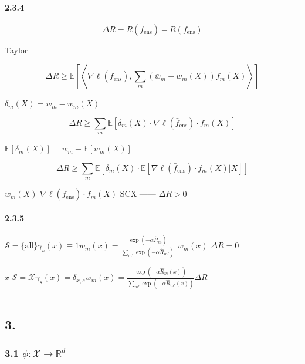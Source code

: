 \documentclass[
  12pt,
]{article}
\begin{document}
\paragraph{2.3.4
}\label{ux4e00ux4e2aux66f4ux7cbeux7ec6ux7684ux8bc1ux660eux901aux8fc7ux5197ux4f59ux5206ux6790}



\[\Delta R = R(\bar{f}_{\text{ens}}) - R(f_{\text{ens}})\]

 Taylor 

\[\Delta R \geq \mathbb{E}\left[\left\langle \nabla \ell(\bar{f}_{\text{ens}}), \sum_m (\bar{w}_m - w_m(X)) f_m(X) \right\rangle\right]\]

 \(\delta_m(X) = \bar{w}_m - w_m(X)\)

\[\Delta R \geq \sum_m \mathbb{E}[\delta_m(X) \cdot \nabla \ell(\bar{f}_{\text{ens}}) \cdot f_m(X)]\]

\(\mathbb{E}[\delta_m(X)] = \bar{w}_m - \mathbb{E}[w_m(X)]\)

\[\Delta R \geq \sum_m \mathbb{E}\left[\delta_m(X) \cdot \mathbb{E}[\nabla \ell(\bar{f}_{\text{ens}}) \cdot f_m(X) | X]\right]\]

 \(w_m(X)\) 
\(\nabla \ell(\bar{f}_{\text{ens}}) \cdot f_m(X)\)  SCX
------ \(\Delta R > 0\)

\paragraph{2.3.5
}\label{ux6781ux7aefux60c5ux51b5ux5f53ux72b6ux6001ux6761ux4ef6ux6743ux91cdux9000ux5316ux4e3aux5168ux5c40ux6743ux91cd}


\(\mathcal{S} = \{\text{all}\}\)\(\gamma_s(x) \equiv 1\)\(w_m(x) = \frac{\exp(-\alpha \hat{R}_m)}{\sum_{m'} \exp(-\alpha \hat{R}_{m'})}\)
\(w_m(x)\)  \(\Delta R = 0\)

 \(x\)
\(\mathcal{S} = \mathcal{X}\)\(\gamma_s(x) = \delta_{x,s}\)\(w_m(x) = \frac{\exp(-\alpha \hat{R}_m(x))}{\sum_{m'} \exp(-\alpha \hat{R}_{m'}(x))}\)\(\Delta R\)


\begin{center}\rule{0.5\linewidth}{0.5pt}\end{center}

\subsection{3.
}\label{ux72b6ux6001ux7a7aux95f4ux6784ux9020ux65b9ux6cd5}

\subsubsection{\texorpdfstring{3.1 
\(\phi: \mathcal{X} \to \mathbb{R}^d\)}{3.1  \textbackslash phi: \textbackslash mathcal\{X\} \textbackslash to \textbackslash mathbb\{R\}\^{}d}}\label{ux5d4cux5165ux6620ux5c04-phi-mathcalx-to-mathbbrd}
\end{document}
